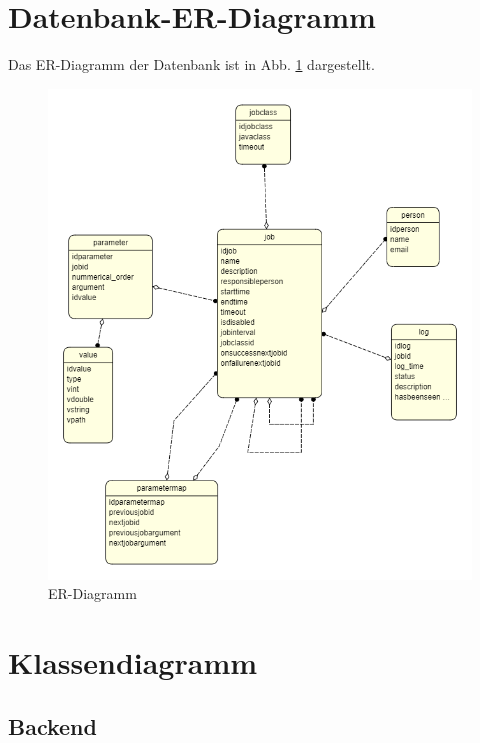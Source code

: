 \documentclass[a4paper,10pt]{article}
\begin{document}
\section{Datenbank-ER-Diagramm}
Das ER-Diagramm der Datenbank ist in Abb. \ref{dber} dargestellt.
\begin{figure}[!htb]
	\centering
	\includegraphics[width=\textwidth]{ER-Diagramm}
	\caption{ER-Diagramm}
	\label{dber}
\end{figure}

\section{Klassendiagramm}
\subsection{Backend}

\end{document}
